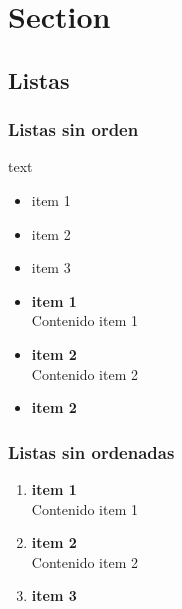 \section{Section}

\subsection{Listas}

\subsubsection{Listas sin orden}
\begin{center}
    \begin{minipage}{0.85\linewidth}
        \vspace{-8pt}%
        {\small
        text
        }
        \vspace{5pt}%
    \end{minipage}
\end{center}

\begin{itemize}[label=\textbf{$\bullet$},itemsep=2pt,partopsep=6pt]
    \item item 1
    \item item 2
    \item item 3
\end{itemize}

\begin{itemize}[label=\textbf{$\bullet$},itemsep=2pt,partopsep=6pt]
    \item \textbf{item 1}\\
    Contenido item 1
    \item \textbf{item 2}\\
    Contenido item 2
    \item \textbf{item 2}
\end{itemize}


\subsubsection{Listas sin ordenadas}

\begin{enumerate}[label=\textbf{\alph*},itemsep=2pt,partopsep=6pt]
    \item \textbf{item 1}\\
    Contenido item 1
    \item \textbf{item 2}\\
    Contenido item 2
    \item \textbf{item 3}
\end{enumerate}